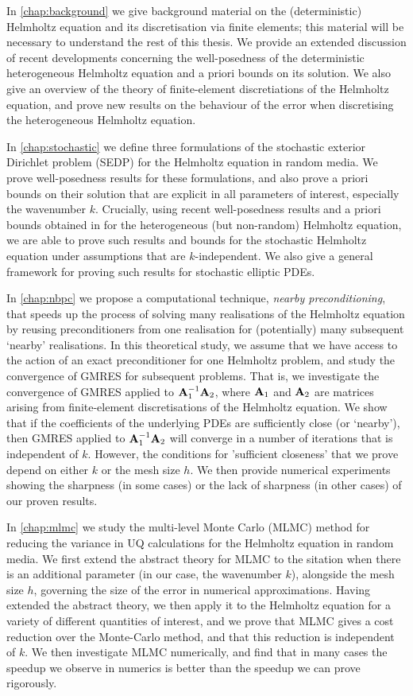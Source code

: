 In \cref{chap:background} we give background material on the (deterministic) Helmholtz equation and its discretisation via finite elements; this material will be necessary to understand the rest of this thesis. We provide an extended discussion of recent developments concerning the well-posedness of the deterministic heterogeneous Helmholtz equation and a priori bounds on its solution. We also give an overview of the theory of finite-element discretiations of the Helmholtz equation, and prove new results on the behaviour of the error when discretising the heterogeneous Helmholtz equation.

In \cref{chap:stochastic} we define three formulations of the stochastic exterior Dirichlet problem (SEDP) for the Helmholtz equation in random media. We prove well-posedness results for these formulations, and also prove a priori bounds on their solution that are explicit in all parameters of interest, especially the wavenumber $k.$ Crucially, using recent well-posedness results and a priori bounds obtained in \cite{GrPeSp:19} for the heterogeneous (but non-random) Helmholtz equation, we are able to prove such results and bounds for the stochastic Helmholtz equation under assumptions that are $k$-independent. We also give a general framework for proving such results for stochastic elliptic PDEs.

In \cref{chap:nbpc} we propose a computational technique, \emph{nearby preconditioning}, that speeds up the process of solving many realisations of the Helmholtz equation by reusing preconditioners from one realisation for (potentially) many subsequent `nearby' realisations. In this theoretical study, we assume that we have access to the action of an exact preconditioner for one Helmholtz problem, and study the convergence of GMRES for subsequent problems. That is, we investigate the convergence of GMRES applied to $\mathbf{A}_{1}^{-1}\mathbf{A}_{2}$, where $\mathbf{A}_{1}$ and $\mathbf{A}_{2}$ are matrices arising from finite-element discretisations of the Helmholtz equation. We show that if the coefficients of the underlying PDEs are sufficiently close (or `nearby'), then GMRES applied to $\mathbf{A}_{1}^{-1}\mathbf{A}_{2}$ will converge in a number of iterations that is independent of $k.$ However, the conditions for 'sufficient closeness' that we prove depend on either $k$ or the mesh size $h$. We then provide numerical experiments showing the sharpness (in some cases) or the lack of sharpness (in other cases) of our proven results.

In \cref{chap:mlmc} we study the multi-level Monte Carlo (MLMC) method for reducing the variance in UQ calculations for the Helmholtz equation in random media. We first extend the abstract theory for MLMC to the sitation when there is an additional parameter (in our case, the wavenumber $k$), alongside the mesh size $h$, governing the size of the error in numerical approximations. Having extended the abstract theory, we then apply it to the Helmholtz equation for a variety of different quantities of interest, and we prove that MLMC gives a cost reduction over the Monte-Carlo method, and that this reduction is independent of $k$. We then investigate MLMC numerically, and find that in many cases the speedup we observe in numerics is better than the speedup we can prove rigorously.

